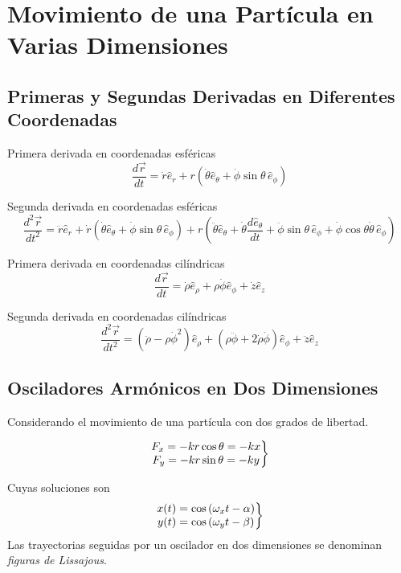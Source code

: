 \chapter{Movimiento de una Partícula en Varias Dimensiones}

\section{Primeras y Segundas Derivadas en Diferentes Coordenadas}
Primera derivada en coordenadas esféricas
$$ \frac{d\vec{r}}{dt} = \dot{r} \hat{e}_r + r \left( \dot{\theta} \hat{e}_\theta + \dot{\phi} \sin\theta \, \hat{e}_\phi \right) $$

Segunda derivada en coordenadas esféricas
$$\frac{d^2\vec{r}}{dt^2} = \ddot{r} \hat{e}_r + \dot{r} \left( \dot{\theta} \hat{e}_\theta + \dot{\phi} \sin\theta \, \hat{e}_\phi \right) + r \left( \ddot{\theta} \hat{e}_\theta + \dot{\theta} \frac{d\hat{e}_\theta}{dt} + \ddot{\phi} \sin\theta \, \hat{e}_\phi + \dot{\phi} \cos\theta \dot{\theta} \, \hat{e}_\phi \right) $$

Primera derivada en coordenadas cilíndricas
$$ \frac{d\vec{r}}{dt} = \dot{\rho} \hat{e}_\rho + \rho \dot{\phi} \hat{e}_\phi + \dot{z} \hat{e}_z $$

Segunda derivada en coordenadas cilíndricas
$$ \frac{d^2\vec{r}}{dt^2} = \left( \ddot{\rho} - \rho \dot{\phi}^2 \right) \hat{e}_\rho + \left( \rho \ddot{\phi} + 2 \dot{\rho} \dot{\phi} \right) \hat{e}_\phi + \ddot{z} \hat{e}_z $$



\section{Osciladores Armónicos en Dos Dimensiones}
Considerando el movimiento de una partícula con dos grados de libertad.

\begin{equation}
	\left. \mqty{F_x = -kr\cos \theta = -kx \\ F_y = -kr\sin \theta = -ky} \right\} 
\end{equation}

Cuyas soluciones son
\begin{equation}
	\left. \mqty{x(t) = \cos{(\omega _x t - \alpha)} \\ y(t) = \cos{(\omega _y t - \beta)}} \right\}
\end{equation}
Las trayectorias seguidas por un oscilador en dos dimensiones se denominan \textit{figuras de Lissajous}.



